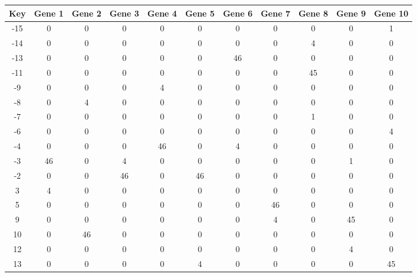 \begin{tabular}{|c|c|c|c|c|c|c|c|c|c|c|}
\hline
Key & Gene 1 & Gene 2 & Gene 3 & Gene 4 & Gene 5 & Gene 6 & Gene 7 & Gene 8 & Gene 9 & Gene 10 \\
\hline
-15 & 0 & 0 & 0 & 0 & 0 & 0 & 0 & 0 & 0 & 1 \\
-14 & 0 & 0 & 0 & 0 & 0 & 0 & 0 & 4 & 0 & 0 \\
-13 & 0 & 0 & 0 & 0 & 0 & 46 & 0 & 0 & 0 & 0 \\
-11 & 0 & 0 & 0 & 0 & 0 & 0 & 0 & 45 & 0 & 0 \\
-9 & 0 & 0 & 0 & 4 & 0 & 0 & 0 & 0 & 0 & 0 \\
-8 & 0 & 4 & 0 & 0 & 0 & 0 & 0 & 0 & 0 & 0 \\
-7 & 0 & 0 & 0 & 0 & 0 & 0 & 0 & 1 & 0 & 0 \\
-6 & 0 & 0 & 0 & 0 & 0 & 0 & 0 & 0 & 0 & 4 \\
-4 & 0 & 0 & 0 & 46 & 0 & 4 & 0 & 0 & 0 & 0 \\
-3 & 46 & 0 & 4 & 0 & 0 & 0 & 0 & 0 & 1 & 0 \\
-2 & 0 & 0 & 46 & 0 & 46 & 0 & 0 & 0 & 0 & 0 \\
3 & 4 & 0 & 0 & 0 & 0 & 0 & 0 & 0 & 0 & 0 \\
5 & 0 & 0 & 0 & 0 & 0 & 0 & 46 & 0 & 0 & 0 \\
9 & 0 & 0 & 0 & 0 & 0 & 0 & 4 & 0 & 45 & 0 \\
10 & 0 & 46 & 0 & 0 & 0 & 0 & 0 & 0 & 0 & 0 \\
12 & 0 & 0 & 0 & 0 & 0 & 0 & 0 & 0 & 4 & 0 \\
13 & 0 & 0 & 0 & 0 & 4 & 0 & 0 & 0 & 0 & 45 \\
\hline
\end{tabular}